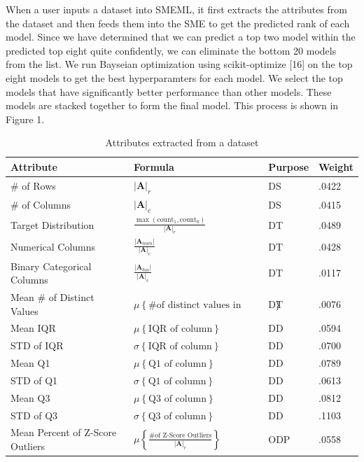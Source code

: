 \documentclass{article}
\begin{document}
When a user inputs a dataset into SMEML, it first extracts the attributes from the dataset and then feeds them into the SME to get the predicted rank of each model. Since we have determined that we can predict a top two model within the predicted top eight quite confidently, we can eliminate the bottom 20 models from the list. We run Bayseian optimization using scikit-optimize [16] on the top eight models to get the best hyperparamters for each model. We select the top models that have significantly better performance than other models. These models are stacked together to form the final model. This process is shown in Figure 1.
\begin{table}
  \caption{Attributes extracted from a dataset}
  \label{model-options-table}
  \centering
  \begin{tabular}{llll}
    \toprule
    Attribute & Formula & Purpose & Weight\\
    \midrule
    \# of Rows & $|\mathbf{A}|_r$ & DS & .0422 \\
    \hline
    \# of Columns & $|\mathbf{A}|_c$ & DS & .0415 \\
    \hline
    Target Distribution &
    $\frac{\max(\text{count}_1, \text{count}_0)}{|\mathbf{A}|_r}$
    & DT & .0489 \\
    \hline
    Numerical Columns &
    $\frac{|\mathbf{A}_{num}|}{|\mathbf{A}|_{c}}$
    & DT & .0428 \\
    \hline
    Binary Categorical Columns &
    $\frac{|\mathbf{A}_{bin}|}{|\mathbf{A}|_{c}}$
    & DT & .0117 \\
    \hline
    Mean \# of Distinct Values  & $\mu \left\{\text{\# of distinct values in column}\right\}$ & DT & .0076 \\ 
    \hline
    Mean IQR  & $\mu \left\{\text{IQR of column}\right\}$ & DD & .0594 \\ 
    \hline
    STD of IQR  & $\sigma \left\{\text{IQR of column}\right\}$ & DD & .0700 \\
    \hline
    Mean Q1 & $\mu \left\{\text{Q1 of column}\right\}$ & DD & .0789 \\
    \hline
    STD of Q1  & $\sigma \left\{\text{Q1 of column}\right\}$ & DD & .0613 \\
    \hline
    Mean Q3  & $\mu \left\{\text{Q3 of column}\right\}$ & DD & .0812 \\
    \hline
    STD of Q3  & $\sigma \left\{\text{Q3 of column}\right\}$ & DD & .1103 \\
    \hline
    Mean Percent of Z-Score Outliers  & 
    $\mu \left\{ \frac{\text{\# of Z-Score Outliers}}{|\mathbf{A}|_r} \right\}$ & ODP & .0558 \\

\end{tabular}
\end{table}
\end{document}
